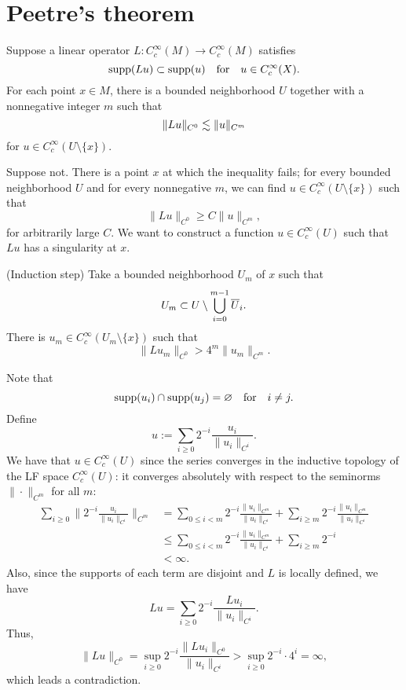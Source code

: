 \documentclass[11pt]{article}
\let\realsection\section
\renewcommand\section{\newpage\realsection}
\begin{document}
\section{Peetre's theorem}


\begin{lem}
Suppose a linear operator $L:C_c^\infty(M)\to C_c^\infty(M)$ satisfies
\[\operatorname{supp}(Lu)\subset\operatorname{supp}(u)\quad\text{for}\quad u\in C_c^\infty(X).\]
For each point $x\in M$, there is a bounded neighborhood $U$ together with a nonnegative integer $m$ such that 
\[\|Lu\|_{C^0}\lesssim\|u\|_{C^m}\]
for $u\in C_c^\infty(U\setminus\{x\})$.
\end{lem}
\begin{pf}
Suppose not.
There is a point $x$ at which the inequality fails; for every bounded neighborhood $U$ and for every nonnegative $m$, we can find $u\in C_c^\infty(U\setminus\{x\})$ such that
\[\|Lu\|_{C^0}\ge C\|u\|_{C^m},\]
for arbitrarily large $C$.
We want to construct a function $u\in C_c^\infty(U)$ such that $Lu$ has a singularity at $x$.

(Induction step)
Take a bounded neighborhood $U_m$ of $x$ such that
\[U_m\subset U\setminus\bigcup_{i=0}^{m-1}\overline U_i.\]
There is $u_m\in C_c^\infty(U_m\setminus\{x\})$ such that
\[\|Lu_m\|_{C^0}>4^m\|u_m\|_{C^m}.\]

Note that
\[\operatorname{supp}(u_i)\cap\operatorname{supp}(u_j)=\varnothing\quad\text{for}\quad i\ne j.\]
Define
\[u:=\sum_{i\ge0}2^{-i}\frac{u_i}{\|u_i\|_{C^i}}.\]
We have that $u\in C_c^\infty(U)$ since the series converges in the inductive topology of the LF space $C_c^\infty(U)$: it converges absolutely with respect to the seminorms $\|\cdot\|_{C^m}$ for all $m$:
\begin{align*}
\sum_{i\ge0}\|2^{-i}\frac{u_i}{\|u_i\|_{C^i}}\|_{C^m}
&=\sum_{0\le i<m}2^{-i}\frac{\|u_i\|_{C^m}}{\|u_i\|_{C^i}}+\sum_{i\ge m}2^{-i}\frac{\|u_i\|_{C^m}}{\|u_i\|_{C^i}}\\
&\le\sum_{0\le i<m}2^{-i}\frac{\|u_i\|_{C^m}}{\|u_i\|_{C^i}}+\sum_{i\ge m}2^{-i}\\
&<\infty.
\end{align*}
Also, since the supports of each term are disjoint and $L$ is locally defined, we have
\[Lu=\sum_{i\ge0}2^{-i}\frac{Lu_i}{\|u_i\|_{C^i}}.\]
Thus,
\[\|Lu\|_{C^0}=\sup_{i\ge0}2^{-i}\frac{\|Lu_i\|_{C^0}}{\|u_i\|_{C^i}}>\sup_{i\ge0}2^{-i}\cdot4^i=\infty,\]
which leads a contradiction.

\end{pf}
\end{document}
